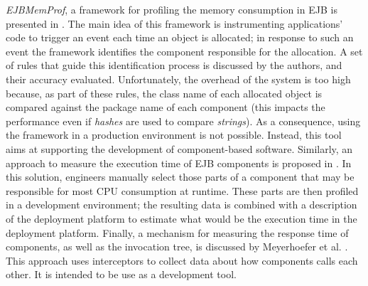 \textit{EJBMemProf}, a framework for profiling the memory consumption in EJB is presented in \cite{Meyerhoefer2005}.
The main idea of this framework is instrumenting applications' code to trigger an event each time an object is allocated; in response to such an event the framework identifies the component responsible for the allocation.
A set of rules that guide this identification process is discussed by the authors, and their accuracy evaluated.
Unfortunately, the overhead of the system is too high because, as part of these rules, the class name of each allocated object is compared against the package name of each component (this impacts the performance even if \textit{hashes} are used to compare \textit{strings}).
As a consequence, using the framework in a production environment is not possible.
Instead, this tool aims at supporting the development of component-based software.
Similarly, an approach to measure the execution time of EJB components is proposed in \cite{Meyerhofer05towardsplatform-independent}.
In this solution, engineers manually select those parts of a component that may be responsible for most CPU consumption at runtime.
These parts are then profiled in a development environment; the resulting data is combined with a description of the deployment platform to estimate what would be the execution time in the deployment platform.
Finally, a mechanism for measuring the response time of components, as well as the invocation tree, is discussed by Meyerhoefer et al. \cite{Meyerhoefer2007}.
This approach uses interceptors to collect data about how components calls each other.
It is intended to be use as a development tool.

